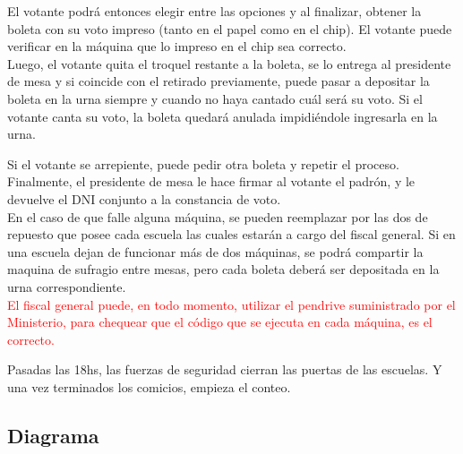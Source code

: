 El votante podrá entonces elegir entre las opciones y al finalizar, obtener la boleta con su voto impreso (tanto en el papel como en el chip). El votante puede verificar en la máquina que lo impreso en el chip sea correcto.\\

Luego, el votante quita el troquel restante a la boleta, se lo entrega al presidente de mesa y si coincide con el retirado previamente, puede pasar a depositar la boleta en la urna siempre y cuando no haya cantado cuál será su voto. Si el votante canta su voto, la boleta quedará anulada impidiéndole ingresarla en la urna. 

Si el votante se arrepiente, puede pedir otra boleta y repetir el proceso.
Finalmente, el presidente de mesa le hace firmar al votante el padrón, y le devuelve el DNI conjunto a la constancia de voto.\\

En el caso de que falle alguna máquina, se pueden reemplazar por las dos de repuesto que posee cada escuela las cuales estarán a cargo del fiscal general. Si en una escuela dejan de funcionar más de dos máquinas, se podrá compartir la maquina de sufragio entre mesas, pero cada boleta deberá ser depositada en la urna correspondiente.\\
\textcolor{red}{El fiscal general puede, en todo momento, utilizar el pendrive suministrado por el Ministerio, para chequear que el código que se ejecuta en cada máquina, es el correcto.}

Pasadas las 18hs, las fuerzas de seguridad cierran las puertas de las escuelas. Y una vez terminados los comicios, empieza el conteo.

\newpage
\subsection{Diagrama}

